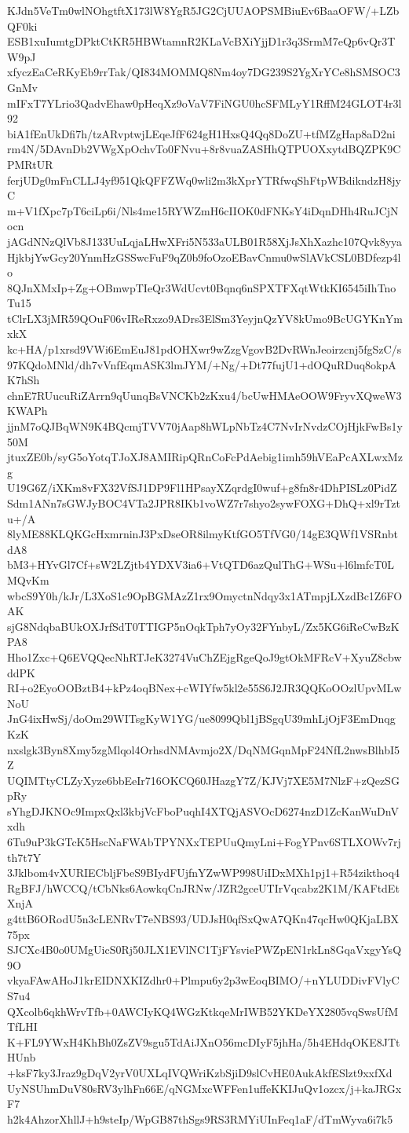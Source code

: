 KJdn5VeTm0wlNOhgtftX173lW8YgR5JG2CjUUAOPSMBiuEv6BaaOFW/+LZbQF0ki
ESB1xuIumtgDPktCtKR5HBWtamnR2KLaVcBXiYjjD1r3q3SrmM7eQp6vQr3TW9pJ
xfyczEaCeRKyEb9rrTak/QI834MOMMQ8Nm4oy7DG239S2YgXrYCe8hSMSOC3GnMv
mIFxT7YLrio3QadvEhaw0pHeqXz9oVaV7FiNGU0hcSFMLyY1RffM24GLOT4r3l92
biA1fEnUkDfi7h/tzARvptwjLEqeJfF624gH1HxsQ4Qq8DoZU+tfMZgHap8aD2ni
rm4N/5DAvnDb2VWgXpOchvTo0FNvu+8r8vuaZASHhQTPUOXxytdBQZPK9CPMRtUR
ferjUDg0mFnCLLJ4yf951QkQFFZWq0wli2m3kXprYTRfwqShFtpWBdikndzH8jyC
m+V1fXpc7pT6ciLp6i/Nls4me15RYWZmH6cIIOK0dFNKsY4iDqnDHh4RuJCjNocn
jAGdNNzQlVb8J133UuLqjaLHwXFri5N533aULB01R58XjJsXhXazhc107Qvk8yya
HjkbjYwGcy20YnmHzGSSwcFuF9qZ0b9foOzoEBavCnmu0wSlAVkCSL0BDfezp4lo
8QJnXMxIp+Zg+OBmwpTIeQr3WdUcvt0Bqnq6nSPXTFXqtWtkKI6545iIhTnoTu15
tClrLX3jMR59QOuF06vIReRxzo9ADrs3ElSm3YeyjnQzYV8kUmo9BcUGYKnYmxkX
kc+HA/p1xrsd9VWi6EmEuJ81pdOHXwr9wZzgVgovB2DvRWnJeoirzcnj5fgSzC/s
97KQdoMNld/dh7vVnfEqmASK3lmJYM/+Ng/+Dt77fujU1+dOQuRDuq8okpAK7hSh
chnE7RUucuRiZArrn9qUunqBsVNCKb2zKxu4/bcUwHMAeOOW9FryvXQweW3KWAPh
jjnM7oQJBqWN9K4BQcmjTVV70jAap8hWLpNbTz4C7NvIrNvdzCOjHjkFwBs1y50M
jtuxZE0b/syG5oYotqTJoXJ8AMIRipQRnCoFcPdAebig1imh59hVEaPcAXLwxMzg
U19G6Z/iXKm8vFX32VfSJ1DP9Fl1HPsayXZqrdgI0wuf+g8fn8r4DhPISLz0PidZ
Sdm1ANn7sGWJyBOC4VTa2JPR8IKb1voWZ7r7shyo2sywFOXG+DhQ+xl9rTztu+/A
8lyME88KLQKGcHxmrninJ3PxDseOR8ilmyKtfGO5TfVG0/14gE3QWf1VSRnbtdA8
bM3+HYvGl7Cf+sW2LZjtb4YDXV3ia6+VtQTD6azQulThG+WSu+l6lmfcT0LMQvKm
wbcS9Y0h/kJr/L3XoS1c9OpBGMAzZ1rx9OmyctnNdqy3x1ATmpjLXzdBc1Z6FOAK
sjG8NdqbaBUkOXJrfSdT0TTIGP5nOqkTph7yOy32FYnbyL/Zx5KG6iReCwBzKPA8
Hho1Zxc+Q6EVQQecNhRTJeK3274VuChZEjgRgeQoJ9gtOkMFRcV+XyuZ8cbwddPK
RI+o2EyoOOBztB4+kPz4oqBNex+cWIYfw5kl2e55S6J2JR3QQKoOOzlUpvMLwNoU
JnG4ixHwSj/doOm29WITsgKyW1YG/ue8099Qbl1jBSgqU39mhLjOjF3EmDnqgKzK
nxslgk3Byn8Xmy5zgMlqol4OrhsdNMAvmjo2X/DqNMGqnMpF24NfL2nwsBlhbI5Z
UQIMTtyCLZyXyze6bbEeIr716OKCQ60JHazgY7Z/KJVj7XE5M7NlzF+zQezSGpRy
sYhgDJKNOc9ImpxQxl3kbjVcFboPuqhI4XTQjASVOcD6274nzD1ZcKanWuDnVxdh
6Tu9uP3kGTcK5HscNaFWAbTPYNXxTEPUuQmyLni+FogYPnv6STLXOWv7rjth7t7Y
3Jklbom4vXURIECbljFbeS9BIydFUjfnYZwWP998UiIDxMXh1pj1+R54zikthoq4
RgBFJ/hWCCQ/tCbNks6AowkqCnJRNw/JZR2gceUTIrVqcabz2K1M/KAFtdEtXnjA
g4ttB6ORodU5n3cLENRvT7eNBS93/UDJsH0qfSxQwA7QKn47qcHw0QKjaLBX75px
SJCXc4B0o0UMgUicS0Rj50JLX1EVlNC1TjFYsviePWZpEN1rkLn8GqaVxgyYsQ9O
vkyaFAwAHoJ1krEIDNXKIZdhr0+Plmpu6y2p3wEoqBIMO/+nYLUDDivFVlyCS7u4
QXcolb6qkhWrvTfb+0AWCIyKQ4WGzKtkqeMrIWB52YKDeYX2805vqSwsUfMTfLHI
K+FL9YWxH4KhBh0ZsZV9sgu5TdAiJXnO56mcDIyF5jhHa/5h4EHdqOKE8JTtHUnb
+ksF7ky3Jraz9gDqV2yrV0UXLqIVQWriKzbSjiD9slCvHE0AukAkfESlzt9xxfXd
UyNSUhmDuV80sRV3ylhFn66E/qNGMxcWFFen1uffeKKIJuQv1ozcx/j+kaJRGxF7
h2k4AhzorXhllJ+h9steIp/WpGB87thSgs9RS3RMYiUInFeq1aF/dTmWyva6i7k5
